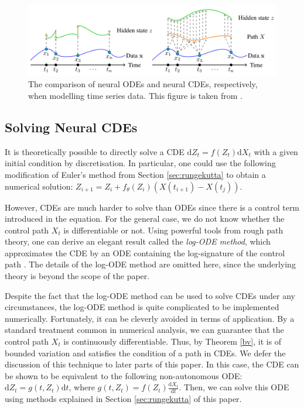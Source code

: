 \documentclass[a4paper,11pt,titlepage]{article}
\theoremstyle{definition}
\theoremstyle{plain}
\theoremstyle{remark}
\begin{document}
\begin{figure}[htbp]
    \centering
    \includegraphics[width=0.75\linewidth]{report/figures/ODE vs CDE implementation Neural CDE for irregular time series.jpeg}
    \caption{The comparison of neural ODEs and neural CDEs, respectively, when modelling time series data. This figure is taken from \cite{kidger2020}.}
    \label{fig:nodesncdes}
\end{figure}

\subsection{Solving Neural CDEs}
\label{sec:CDEs}

It is theoretically possible to directly solve a CDE $\mathrm{d}Z_t = f(Z_t)\mathrm{d}X_t$ with a given initial condition by discretisation. In particular, one could use the following modification of Euler's method from Section \ref{sec:rungekutta} to obtain a numerical solution: $Z_{i+1}=Z_i+f_\theta(Z_i)(X(t_{i+1})-X(t_j))$.

However, CDEs are much harder to solve than ODEs since there is a control term introduced in the equation. For the general case, we do not know whether the control path $X_t$ is differentiable or not. Using powerful tools from rough path theory, one can derive an elegant result called the \textit{log-ODE method}, which approximates the CDE by an ODE containing the log-signature of the control path \cite{morrill2021}. The details of the log-ODE method are omitted here, since the underlying theory is beyond the scope of the paper.

Despite the fact that the log-ODE method can be used to solve CDEs under any circumstances, the log-ODE method is quite complicated to be implemented numerically. Fortunately, it can be cleverly avoided in terms of application. By a standard treatment common in numerical analysis, we can guarantee that the control path $X_t$ is continuously differentiable. Thus, by Theorem \ref{bv}, it is of bounded variation and satisfies the condition of a path in CDEs. We defer the discussion of this technique to later parts of this paper. In this case, the CDE can be shown to be equivalent to the following non-autonomous ODE: $\mathrm{d}Z_t=g(t,Z_t)\mathrm{d}t$, where $g(t,Z_t)=f(Z_t)\frac{\mathrm{d}X_t}{\mathrm{d}t}$. Then, we can solve this ODE using methods explained in Section \ref{sec:rungekutta} of this paper.
\end{document}
